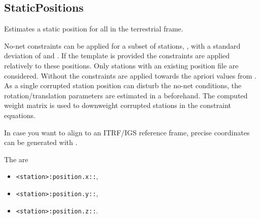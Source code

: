 \subsection{StaticPositions}\label{gnssParametrizationType:staticPositions}
Estimates a static position for all
 in the terrestrial frame.

No-net constraints can be applied for a subset of stations,
, with a
standard deviation of  and .
If the template  is provided
the constraints are applied relatively to these positions. Only stations with an existing position file
are considered. Without 
the constraints are applied towards the apriori values from
.
As a single corrupted station position can disturb the no-net conditions,
the rotation/translation parameters are estimated in a
beforehand. The computed weight matrix is used to downweight corrupted stations
in the constraint equations.

In case you want to align to an ITRF/IGS reference frame, precise coordinates can be
generated with .

The  are
\begin{itemize}
\item \verb|<station>:position.x::|,
\item \verb|<station>:position.y::|,
\item \verb|<station>:position.z::|.
\end{itemize}



